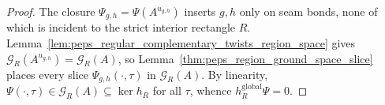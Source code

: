 \begin{proof}\leanok
    The closure $\Psi_{g,h}=\Psi(A^{u_{g,h}})$ inserts $g,h$ only on seam
    bonds, none of which is incident to the strict interior rectangle $R$.
    Lemma~\ref{lem:peps_regular_complementary_twists_region_space} gives
    $\mathcal G_R(A^{u_{g,h}})=\mathcal G_R(A)$, so
    Lemma~\ref{thm:peps_region_ground_space_slice} places every slice
    $\Psi_{g,h}(\cdot,\tau)$ in $\mathcal G_R(A)$. By linearity,
    $\Psi(\cdot,\tau)\in\mathcal G_R(A)\subseteq\ker h_R$ for all $\tau$,
    whence $h_R^{\mathrm{global}}\Psi=0$.
\end{proof}
